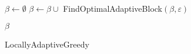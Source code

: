 \IncMargin{2em}
\begin{algorithm}[h]
	\LinesNumbered
	$\beta\gets\emptyset$ 
	{
		$\beta\gets \beta\cup$ FindOptimalAdaptiveBlock$(\beta,\varepsilon)$
	}

	\Return $\beta$
	\caption{LocallyAdaptiveGreedy}\label{algo:local}
\end{algorithm}\DecMargin{1em}


